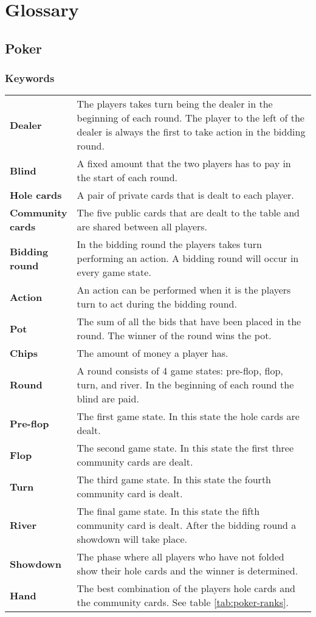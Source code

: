 \section*{Glossary}

\subsection*{Poker}
\subsubsection*{Keywords}
\begin{tabular}{ p{0.18\linewidth} p{0.82\linewidth} }
\textbf{Dealer} & The players takes turn being the dealer in the beginning of each round. The player to the left of the dealer is always the first to take action in the bidding round.\\
\textbf{Blind} & A fixed amount that the two players has to pay in the start of each round.\\
\textbf{Hole cards} & A pair of private cards that is dealt to each player. \\
\textbf{Community cards} & The five public cards that are dealt to the table and are shared between all players.\\
\textbf{Bidding round} & In the bidding round the players takes turn performing an action. A bidding round will occur in every game state.\\
\textbf{Action} & An action can be performed when it is the players turn to act during the bidding round.\\
\textbf{Pot} & The sum of all the bids that have been placed in the round. The winner of the round wins the pot.\\
\textbf{Chips} & The amount of money a player has.\\
\textbf{Round} & A round consists of 4 game states: pre-flop, flop, turn, and river. In the beginning of each round the blind are paid.\\
\textbf{Pre-flop} & The first game state. In this state the hole cards are dealt.\\
\textbf{Flop} & The second game state. In this state the first three community cards are dealt.\\
\textbf{Turn} & The third game state. In this state the fourth community card is dealt.\\
\textbf{River} & The final game state. In this state the fifth community card is dealt. After the bidding round a showdown will take place.\\
\textbf{Showdown} & The phase where all players who have not folded show their hole cards and the winner is determined.\\
\textbf{Hand} & The best combination of the players hole cards and the community cards. See table \ref{tab:poker-ranks}.
\end{tabular}

